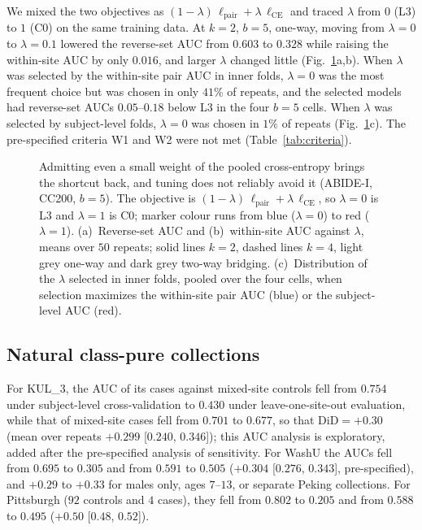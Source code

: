 We mixed the two objectives as $(1-\lambda)\,\ell_{\mathrm{pair}}+\lambda\,\ell_{\mathrm{CE}}$ and traced $\lambda$ from $0$ (L3) to $1$ (C0) on the same training data. At $k=2$, $b=5$, one-way, moving from $\lambda=0$ to $\lambda=0.1$ lowered the reverse-set AUC from $0.603$ to $0.328$ while raising the within-site AUC by only $0.016$, and larger $\lambda$ changed little (Fig.~\ref{fig:lambda}a,b). When $\lambda$ was selected by the within-site pair AUC in inner folds, $\lambda=0$ was the most frequent choice but was chosen in only $41\%$ of repeats, and the selected models had reverse-set AUCs $0.05$--$0.18$ below L3 in the four $b=5$ cells. When $\lambda$ was selected by subject-level folds, $\lambda=0$ was chosen in $1\%$ of repeats (Fig.~\ref{fig:lambda}c). The pre-specified criteria W1 and W2 were not met (Table~\ref{tab:criteria}).

\begin{figure}[tbp]
\centering
{}
\caption{Admitting even a small weight of the pooled cross-entropy brings the shortcut back, and tuning does not reliably avoid it (ABIDE-I, CC200, $b=5$). The objective is $(1-\lambda)\,\ell_{\mathrm{pair}}+\lambda\,\ell_{\mathrm{CE}}$, so $\lambda=0$ is L3 and $\lambda=1$ is C0; marker colour runs from blue ($\lambda=0$) to red ($\lambda=1$). (a)~Reverse-set AUC and (b)~within-site AUC against $\lambda$, means over $50$ repeats; solid lines $k=2$, dashed lines $k=4$, light grey one-way and dark grey two-way bridging. (c)~Distribution of the $\lambda$ selected in inner folds, pooled over the four cells, when selection maximizes the within-site pair AUC (blue) or the subject-level AUC (red).}
\label{fig:lambda}
\end{figure}

\subsection{Natural class-pure collections}

For KUL\_3, the AUC of its cases against mixed-site controls fell from $0.754$ under subject-level cross-validation to $0.430$ under leave-one-site-out evaluation, while that of mixed-site cases fell from $0.701$ to $0.677$, so that $\mathrm{DiD}=+0.30$ (mean over repeats $+0.299$ [$0.240$, $0.346$]); this AUC analysis is exploratory, added after the pre-specified analysis of sensitivity. For WashU the AUCs fell from $0.695$ to $0.305$ and from $0.591$ to $0.505$ ($+0.304$ [$0.276$, $0.343$], pre-specified), and $+0.29$ to $+0.33$ for males only, ages $7$--$13$, or separate Peking collections. For Pittsburgh ($92$ controls and $4$ cases), they fell from $0.802$ to $0.205$ and from $0.588$ to $0.495$ ($+0.50$ [$0.48$, $0.52$]).

